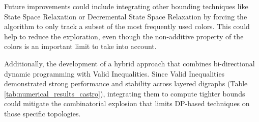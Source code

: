 \documentclass[pdflatex,sn-mathphys-num]{sn-jnl}
\begin{document}
Future improvements could include integrating other bounding techniques like State Space Relaxation \cite{Christofidesetal1981} or Decremental State Space Relaxation \cite{righini2006} by forcing the algorithm 
to only track a subset of the most frequently used colors. This could help to reduce the exploration,
even though the non-additive property of the colors is an important limit to take into account. 

Additionally, the development of a hybrid approach that combines bi-directional dynamic programming 
with Valid Inequalities. 
Since Valid Inequalities \cite{Castro2024} demonstrated strong performance and stability across layered digraphs (Table \ref{tab:numerical_results_castro}), 
integrating them to compute tighter bounds could 
mitigate the combinatorial explosion that limits DP-based techniques on those specific topologies.

\end{document}
